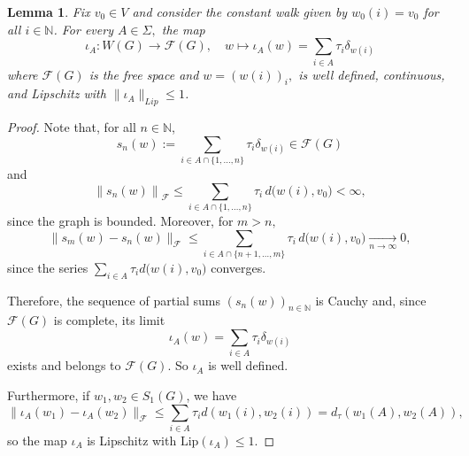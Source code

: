 \documentclass[preprint,12pt]{elsarticle}
\newtheorem{lemma}[theorem]{Lemma}
\begin{document}







\begin{lemma} \label{precom}
Fix $v_0 \in V$ and consider the constant walk given by $w_0(i)=v_0$ for all $i \in \mathbb N$. For every $A \in \Sigma,$ the map
$$
\iota_A \colon W(G) \to \mathcal F(G), \quad w \mapsto \iota_A(w)=\sum_{i \in A} \tau_i\delta_{w(i)}
$$
where $\mathcal{F}(G)$ is the free space and $w = (w(i))_i,$ is well defined, continuous, and Lipschitz with $\|\iota_A\|_{Lip} \leq 1$.
\end{lemma}
\begin{proof}
 Note that, for all $n \in \mathbb{N}$,
$$
s_n(w):=\sum_{i \in A \cap \{1,\dots ,n\}} \tau_i \delta_{w(i)} \in \mathcal F(G)
$$
and
$$
\left\|s_n(w)\right\|_{\mathcal F} \le\sum_{i\in A \cap \{1,\dots ,n\}}\tau_i\,d\bigl(w(i),v_0\bigr) < \infty,
$$
since the graph is bounded.
Moreover, for $m>n,$
$$
\|s_m(w)-s_n(w)\|_{\mathcal F}
      \le\sum_{i\in A\cap\{n+1,\dots ,m\}}\tau_i\,d\bigl(w(i),v_0\bigr)
      \xrightarrow[n\to\infty]{}0,
$$
since the series $\sum_{i\in A}\tau_i d\bigl(w(i),v_0\bigr)$ converges.

Therefore, the sequence of partial sums $(s_n(w))_{n\in\mathbb N}$ is Cauchy and, since $\mathcal{F}(G)$ is complete, its limit
$$
\iota_A(w) = \sum_{i \in A} \tau_i \delta_{w(i)}
$$
exists and belongs to $\mathcal{F}(G).$ So $\iota_A$ is well defined.

Furthermore, if $w_1, w_2 \in S_1(G)$, we have
$$
\|\iota_A(w_1) - \iota_A(w_2)\|_{\mathcal F} \leq \sum_{i \in A} \tau_i d(w_1(i), w_2(i)) = d_\tau(w_1(A), w_2(A)),
$$
so the map $\iota_A$ is Lipschitz with $\mathrm{Lip}(\iota_A) \leq 1$.
\end{proof}
\end{document}
